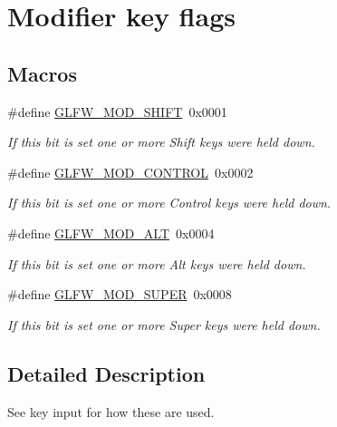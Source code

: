 \hypertarget{group__mods}{}\section{Modifier key flags}
\label{group__mods}
\subsection*{Macros}
\begin{DoxyCompactItemize}
\item 
\mbox{\label{group__mods_ga14994d3196c290aaa347248e51740274}} 
\#define \hyperlink{group__mods_ga14994d3196c290aaa347248e51740274}{G\+L\+F\+W\+\_\+\+M\+O\+D\+\_\+\+S\+H\+I\+FT}~0x0001
\begin{DoxyCompactList}\small\item\em If this bit is set one or more Shift keys were held down. \end{DoxyCompactList}\item 
\mbox{\label{group__mods_ga6ed94871c3208eefd85713fa929d45aa}} 
\#define \hyperlink{group__mods_ga6ed94871c3208eefd85713fa929d45aa}{G\+L\+F\+W\+\_\+\+M\+O\+D\+\_\+\+C\+O\+N\+T\+R\+OL}~0x0002
\begin{DoxyCompactList}\small\item\em If this bit is set one or more Control keys were held down. \end{DoxyCompactList}\item 
\mbox{\label{group__mods_gad2acd5633463c29e07008687ea73c0f4}} 
\#define \hyperlink{group__mods_gad2acd5633463c29e07008687ea73c0f4}{G\+L\+F\+W\+\_\+\+M\+O\+D\+\_\+\+A\+LT}~0x0004
\begin{DoxyCompactList}\small\item\em If this bit is set one or more Alt keys were held down. \end{DoxyCompactList}\item 
\mbox{\label{group__mods_ga6b64ba10ea0227cf6f42efd0a220aba1}} 
\#define \hyperlink{group__mods_ga6b64ba10ea0227cf6f42efd0a220aba1}{G\+L\+F\+W\+\_\+\+M\+O\+D\+\_\+\+S\+U\+P\+ER}~0x0008
\begin{DoxyCompactList}\small\item\em If this bit is set one or more Super keys were held down. \end{DoxyCompactList}\end{DoxyCompactItemize}


\subsection{Detailed Description}
See key input for how these are used. 